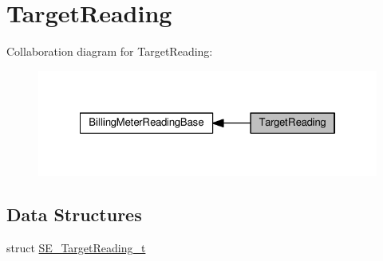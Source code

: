 \hypertarget{group__TargetReading}{}\section{Target\+Reading}
\label{group__TargetReading}
Collaboration diagram for Target\+Reading\+:\nopagebreak
\begin{figure}[H]
\begin{center}
\leavevmode
\includegraphics[width=322pt]{group__TargetReading}
\end{center}
\end{figure}
\subsection*{Data Structures}
\begin{DoxyCompactItemize}
\item 
struct \hyperlink{structSE__TargetReading__t}{S\+E\+\_\+\+Target\+Reading\+\_\+t}
\end{DoxyCompactItemize}

